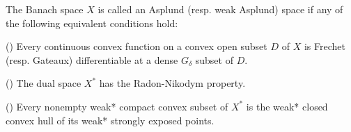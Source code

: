 \begin{definition}
  \label{def:asplund_space}
  The Banach space $X$ is called an Asplund (resp. weak Asplund) space if any of the following equivalent conditions hold:

  \begin{defenum}
    \item(\cite[theorem 2.14]{Phelps1993}) Every continuous convex function on a convex open subset $D$ of $X$ is Frechet (resp. Gateaux) differentiable at a dense $G_\delta$ subset of $D$.
    \item(\cite[definition 5.2]{Phelps1993}) The dual space $X^*$ has the Radon-Nikodym property.
    \item(\cite[theorem 5.12]{Phelps1993}) Every nonempty weak* compact convex subset of $X^*$ is the weak* closed convex hull of its weak* strongly exposed points.
  \end{defenum}
\end{definition}
